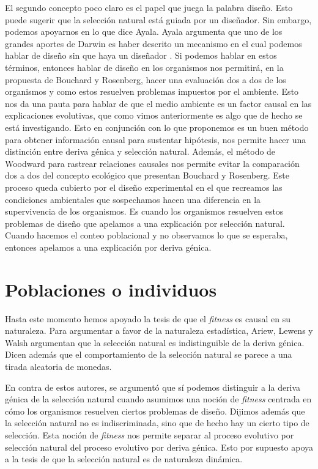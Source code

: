 El segundo concepto poco claro es el papel que juega la palabra diseño. Esto puede sugerir que la selección natural está guiada por un diseñador. Sin embargo, podemos apoyarnos en lo que dice Ayala. Ayala argumenta que uno de los grandes aportes de Darwin es haber descrito un mecanismo en el cual podemos hablar de diseño sin que haya un diseñador \cite{Ayala2004}. Si podemos hablar en estos términos, entonces hablar de diseño en los organismos nos permitirá, en la propuesta de Bouchard y Rosenberg, hacer una evaluación dos a dos de los organismos y como estos resuelven problemas impuestos por el ambiente. Esto nos da una pauta para hablar de que el medio ambiente es un factor causal en las explicaciones evolutivas, que como vimos anteriormente es algo que de hecho se está investigando. Esto en conjunción con lo que proponemos es un buen método para obtener información causal para sustentar hipótesis, nos permite hacer una distinción entre deriva génica y selección natural. Además, el método de Woodward para rastrear relaciones causales nos permite evitar la comparación dos a dos del concepto  ecológico que presentan Bouchard y Rosenberg. Este proceso queda cubierto por el diseño experimental en el que recreamos las condiciones ambientales que sospechamos hacen una diferencia en la supervivencia de los organismos. Es cuando los organismos resuelven estos problemas de diseño que apelamos a una explicación por selección natural. Cuando hacemos el conteo poblacional y no observamos lo que se esperaba, entonces apelamos a una explicación por deriva génica.

\section{Poblaciones o individuos}

\noindent Hasta este momento hemos apoyado la tesis de que el \emph{fitness} es causal en su naturaleza. Para argumentar a favor de la naturaleza estadística, Ariew, Lewens y Walsh argumentan que la selección natural es indistinguible de la deriva génica. Dicen además que el comportamiento de la selección natural se parece a una tirada aleatoria de monedas.

En contra de estos autores, se argumentó que sí podemos distinguir a la deriva génica de la selección natural cuando asumimos una noción de \emph{fitness} centrada en cómo los organismos resuelven ciertos problemas de diseño. Dijimos además que la selección natural no es indiscriminada, sino que de hecho hay un cierto tipo de selección. Esta noción de \emph{fitness} nos permite separar al proceso evolutivo por selección natural del proceso evolutivo por deriva génica. Esto por supuesto apoya a la tesis de que la selección natural es de naturaleza dinámica.

